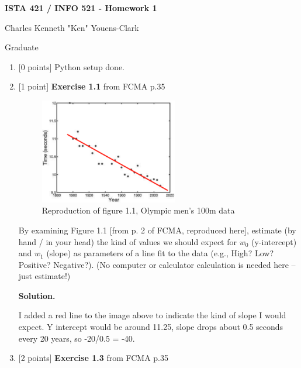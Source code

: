 \documentclass[10pt]{article}
\begin{document}
\begin{center}
    {\Large {\bf ISTA 421 / INFO 521 - Homework 1}} \\
\end{center}

\begin{flushright}
Charles Kenneth "Ken" Youens-Clark

Graduate 
\end{flushright}

\vspace{1cm}

\begin{enumerate}

\item \label{prob:1} [0 points]
Python setup done.

\item \label{prob:2} [1 point]
{\bf Exercise 1.1} from FCMA p.35

\begin{figure}[htb]
\begin{center}
\includegraphics[width=6cm]{figures/figure1-1_p2}
\caption{Reproduction of figure 1.1, Olympic men's 100m data}
\end{center}
\end{figure}
By examining Figure 1.1 [from p. 2 of FCMA, reproduced here], estimate (by hand / in your head) the kind of values we should expect for $w_0$ (y-intercept) and $w_1$ (slope) as parameters of a line fit to the data (e.g., High? Low?  Positive?  Negative?).  (No computer or calculator calculation is needed here -- just estimate!)

{\bf Solution.} 

I added a red line to the image above to indicate the kind of slope I would expect. Y intercept would be around 11.25, slope drops about 0.5 seconds every 20 years, so -20/0.5 = -40.


\item \label{prob:3} [2 points]
{\bf Exercise 1.3} from FCMA p.35


\end{enumerate}
\end{document}
